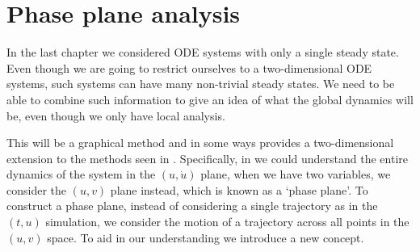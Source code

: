 \chapter{Phase plane analysis}\label{Phase plane analysis}
In the last chapter we considered ODE systems with only a single steady state. Even though we are going to restrict ourselves to a two-dimensional ODE systems, such systems can have many non-trivial steady states. We need to be able to combine such information to give an idea of what the global dynamics will be, even though we only have local analysis. 

This will be a graphical method and in some ways provides a two-dimensional extension to the methods seen in . Specifically, in  we could understand the entire dynamics of the system in the $(u,\dot{u})$ plane, when we have two variables, we consider the $(u,v)$ plane instead, which is known as a `phase plane'. To construct a phase plane, instead of considering a single trajectory as in the $(t,u)$ simulation, we consider the motion of a trajectory across all points in the $(u,v)$ space. To aid in our understanding we introduce a new concept.

